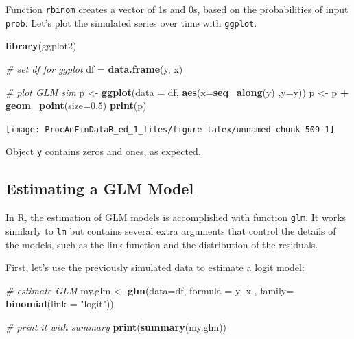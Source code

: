 \documentclass[11pt,]{book}
\newenvironment{Shaded}{\begin{snugshade}}{\end{snugshade}}
\newcommand{\KeywordTok}[1]{\textcolor[rgb]{0.27,0.27,0.27}{\textbf{#1}}}
\newcommand{\DataTypeTok}[1]{\textcolor[rgb]{0.27,0.27,0.27}{#1}}
\newcommand{\FloatTok}[1]{\textcolor[rgb]{0.06,0.06,0.06}{#1}}
\newcommand{\StringTok}[1]{\textcolor[rgb]{0.5,0.5,0.5}{#1}}
\newcommand{\CommentTok}[1]{\textcolor[rgb]{0.56,0.35,0.01}{\textit{#1}}}
\newcommand{\OperatorTok}[1]{\textcolor[rgb]{0.81,0.36,0.00}{\textbf{#1}}}
\newcommand{\NormalTok}[1]{#1}
\begin{document}
Function \texttt{rbinom} creates a vector of 1s and 0s, based on the
probabilities of input \texttt{prob}. Let's plot the simulated series
over time with \texttt{ggplot}.

\begin{Shaded}
\begin{Highlighting}[]
\KeywordTok{library}\NormalTok{(ggplot2)}

\CommentTok{# set df for ggplot}
\NormalTok{df =}\StringTok{ }\KeywordTok{data.frame}\NormalTok{(y, x)}

\CommentTok{# plot GLM sim}
\NormalTok{p <-}\StringTok{ }\KeywordTok{ggplot}\NormalTok{(}\DataTypeTok{data =}\NormalTok{ df, }\KeywordTok{aes}\NormalTok{(}\DataTypeTok{x=}\KeywordTok{seq_along}\NormalTok{(y) ,}\DataTypeTok{y=}\NormalTok{y))}
\NormalTok{p <-}\StringTok{ }\NormalTok{p }\OperatorTok{+}\StringTok{ }\KeywordTok{geom_point}\NormalTok{(}\DataTypeTok{size=}\FloatTok{0.5}\NormalTok{)}
\KeywordTok{print}\NormalTok{(p)}
\end{Highlighting}
\end{Shaded}

\begin{center}\texttt{[image: ProcAnFinDataR\_ed\_1\_files/figure-latex/unnamed-chunk-509-1]} \end{center}

Object \texttt{y} contains zeros and ones, as expected.

\subsection{Estimating a GLM Model}\label{estimating-a-glm-model}

In R, the estimation of GLM models is accomplished with function
\texttt{glm}. It works similarly to \texttt{lm} but contains several
extra arguments that control the details of the models, such as the link
function and the distribution of the residuals.

First, let's use the previously simulated data to estimate a logit
model:

\begin{Shaded}
\begin{Highlighting}[]
\CommentTok{# estimate GLM}
\NormalTok{my.glm <-}\StringTok{ }\KeywordTok{glm}\NormalTok{(}\DataTypeTok{data=}\NormalTok{df, }
              \DataTypeTok{formula =}\NormalTok{ y}\OperatorTok{~}\NormalTok{x , }
              \DataTypeTok{family=} \KeywordTok{binomial}\NormalTok{(}\DataTypeTok{link =} \StringTok{"logit"}\NormalTok{))}

\CommentTok{# print it with summary}
\KeywordTok{print}\NormalTok{(}\KeywordTok{summary}\NormalTok{(my.glm))}
\end{Highlighting}
\end{Shaded}
\end{document}
